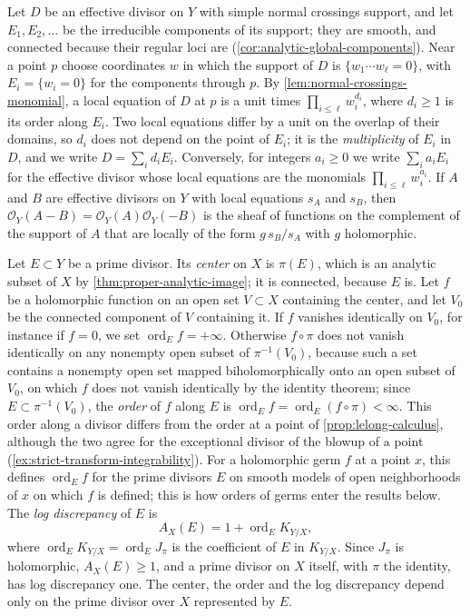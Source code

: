 Let $D$ be an effective divisor on $Y$ with simple normal crossings support, and let $E_1,E_2,\ldots$ be the irreducible components of its support; they are smooth, and connected because their regular loci are (\cref{cor:analytic-global-components}). Near a point $p$ choose coordinates $w$ in which the support of $D$ is $\{w_1\cdots w_\ell=0\}$, with $E_i=\{w_i=0\}$ for the components through $p$. By \cref{lem:normal-crossings-monomial}, a local equation of $D$ at $p$ is a unit times $\prod_{i\leq\ell}w_i^{d_i}$, where $d_i\geq1$ is its order along $E_i$. Two local equations differ by a unit on the overlap of their domains, so $d_i$ does not depend on the point of $E_i$; it is the \emph{multiplicity} of $E_i$ in $D$, and we write $D=\sum_id_iE_i$. Conversely, for integers $a_i\geq0$ we write $\sum_ia_iE_i$ for the effective divisor whose local equations are the monomials $\prod_{i\leq\ell}w_i^{a_i}$. If $A$ and $B$ are effective divisors on $Y$ with local equations $s_A$ and $s_B$, then $\mathcal O_Y(A-B)=\mathcal O_Y(A)\mathcal O_Y(-B)$ is the sheaf of functions on the complement of the support of $A$ that are locally of the form $g\,s_B/s_A$ with $g$ holomorphic.

\begin{definition}\label{def:divisorial-order-discrepancy}
Let $E\subset Y$ be a prime divisor. Its \emph{center} on $X$ is $\pi(E)$, which is an analytic subset of $X$ by \cref{thm:proper-analytic-image}; it is connected, because $E$ is. Let $f$ be a holomorphic function on an open set $V\subset X$ containing the center, and let $V_0$ be the connected component of $V$ containing it. If $f$ vanishes identically on $V_0$, for instance if $f=0$, we set $\operatorname{ord}_Ef=+\infty$. Otherwise $f\circ\pi$ does not vanish identically on any nonempty open subset of $\pi^{-1}(V_0)$, because such a set contains a nonempty open set mapped biholomorphically onto an open subset of $V_0$, on which $f$ does not vanish identically by the identity theorem; since $E\subset\pi^{-1}(V_0)$, the \emph{order} of $f$ along $E$ is $\operatorname{ord}_Ef=\operatorname{ord}_E(f\circ\pi)<\infty$. This order along a divisor differs from the order at a point of \cref{prop:lelong-calculus}, although the two agree for the exceptional divisor of the blowup of a point (\cref{ex:strict-transform-integrability}). For a holomorphic germ $f$ at a point $x$, this defines $\operatorname{ord}_Ef$ for the prime divisors $E$ on smooth models of open neighborhoods of $x$ on which $f$ is defined; this is how orders of germs enter the results below. The \emph{log discrepancy} of $E$ is
\[
 A_X(E)=1+\operatorname{ord}_E K_{Y/X},
\]
where $\operatorname{ord}_EK_{Y/X}=\operatorname{ord}_EJ_\pi$ is the coefficient of $E$ in $K_{Y/X}$. Since $J_\pi$ is holomorphic, $A_X(E)\geq1$, and a prime divisor on $X$ itself, with $\pi$ the identity, has log discrepancy one. The center, the order and the log discrepancy depend only on the prime divisor over $X$ represented by $E$.
\end{definition}

